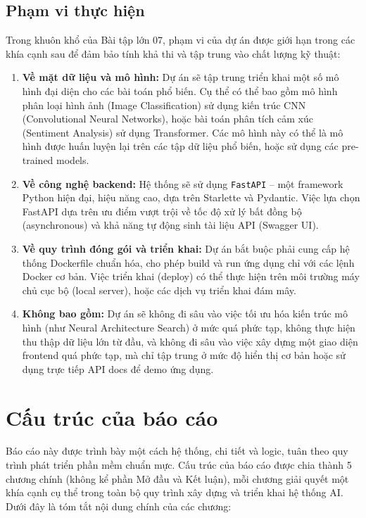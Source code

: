 \documentclass[12pt,a4paper]{article}
\begin{document}
\subsection{Phạm vi thực hiện}

Trong khuôn khổ của Bài tập lớn 07, phạm vi của dự án được giới hạn trong các khía cạnh sau để đảm bảo tính khả thi và tập trung vào chất lượng kỹ thuật:
\begin{enumerate}
    \item \textbf{Về mặt dữ liệu và mô hình:} Dự án sẽ tập trung triển khai một số mô hình đại diện cho các bài toán phổ biến. Cụ thể có thể bao gồm mô hình phân loại hình ảnh (Image Classification) sử dụng kiến trúc CNN (Convolutional Neural Networks), hoặc bài toán phân tích cảm xúc (Sentiment Analysis) sử dụng Transformer. Các mô hình này có thể là mô hình được huấn luyện lại trên các tập dữ liệu phổ biến, hoặc sử dụng các pre-trained models.
    \item \textbf{Về công nghệ backend:} Hệ thống sẽ sử dụng \texttt{FastAPI} – một framework Python hiện đại, hiệu năng cao, dựa trên Starlette và Pydantic. Việc lựa chọn FastAPI dựa trên ưu điểm vượt trội về tốc độ xử lý bất đồng bộ (asynchronous) và khả năng tự động sinh tài liệu API (Swagger UI).
    \item \textbf{Về quy trình đóng gói và triển khai:} Dự án bắt buộc phải cung cấp hệ thống Dockerfile chuẩn hóa, cho phép build và run ứng dụng chỉ với các lệnh Docker cơ bản. Việc triển khai (deploy) có thể thực hiện trên môi trường máy chủ cục bộ (local server), hoặc các dịch vụ triển khai đám mây.
    \item \textbf{Không bao gồm:} Dự án sẽ không đi sâu vào việc tối ưu hóa kiến trúc mô hình (như Neural Architecture Search) ở mức quá phức tạp, không thực hiện thu thập dữ liệu lớn từ đầu, và không đi sâu vào việc xây dựng một giao diện frontend quá phức tạp, mà chỉ tập trung ở mức độ hiển thị cơ bản hoặc sử dụng trực tiếp API docs để demo ứng dụng.
\end{enumerate}

\newpage
\section{Cấu trúc của báo cáo}

Báo cáo này được trình bày một cách hệ thống, chi tiết và logic, tuân theo quy trình phát triển phần mềm chuẩn mực. Cấu trúc của báo cáo được chia thành 5 chương chính (không kể phần Mở đầu và Kết luận), mỗi chương giải quyết một khía cạnh cụ thể trong toàn bộ quy trình xây dựng và triển khai hệ thống AI. Dưới đây là tóm tắt nội dung chính của các chương:
\end{document}
